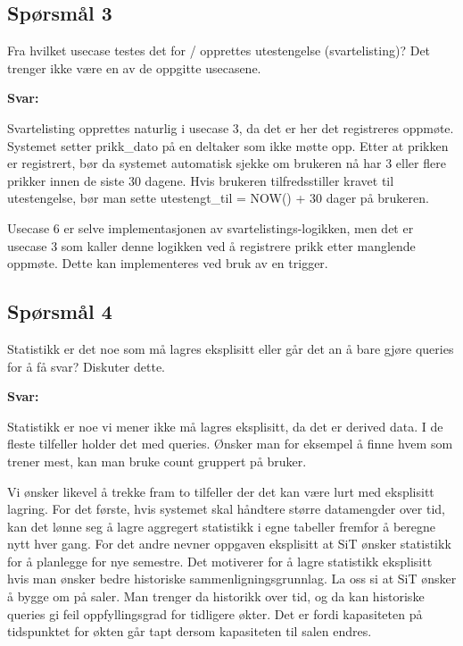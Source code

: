 \subsection*{Spørsmål 3}

Fra hvilket usecase testes det for / opprettes utestengelse (svartelisting)? Det trenger ikke være en av de oppgitte usecasene.

\textbf{Svar:}

Svartelisting opprettes naturlig i usecase 3, da det er her det registreres oppmøte. Systemet setter prikk\_dato på en deltaker som ikke møtte opp. Etter at prikken er registrert, bør da systemet automatisk sjekke om brukeren nå har 3 eller flere prikker innen de siste 30 dagene. Hvis brukeren tilfredsstiller kravet til utestengelse, bør man sette utestengt\_til = NOW() + 30 dager på brukeren.

Usecase 6 er selve implementasjonen av svartelistings-logikken, men det er usecase 3 som kaller denne logikken ved å registrere prikk etter manglende oppmøte. Dette kan implementeres ved bruk av en trigger.

\subsection*{Spørsmål 4}

Statistikk er det noe som må lagres eksplisitt eller går det an å bare gjøre queries for å få svar? Diskuter dette.

\textbf{Svar:}

Statistikk er noe vi mener ikke må lagres eksplisitt, da det er derived data. I de fleste tilfeller holder det med queries. Ønsker man for eksempel å finne hvem som trener mest, kan man bruke count gruppert på bruker.

Vi ønsker likevel å trekke fram to tilfeller der det kan være lurt med eksplisitt lagring. For det første, hvis systemet skal håndtere større datamengder over tid, kan det lønne seg å lagre aggregert statistikk i egne tabeller fremfor å beregne nytt hver gang. For det andre nevner oppgaven eksplisitt at SiT ønsker statistikk for å planlegge for nye semestre. Det motiverer for å lagre statistikk eksplisitt hvis man ønsker bedre historiske sammenligningsgrunnlag. La oss si at SiT ønsker å bygge om på saler. Man trenger da historikk over tid, og da kan historiske queries gi feil oppfyllingsgrad for tidligere økter. Det er fordi kapasiteten på tidspunktet for økten går tapt dersom kapasiteten til salen endres.
